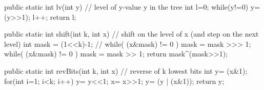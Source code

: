 

public static int lv(int y) 
// level of y-value y in the tree
{
int l=0;
while(y!=0)
    {
    y=(y>>1);
    l++;
    }
return l;
}




public static int shift(int k, int x)
// shift on the level of x (and step on the next level)
{
int mask = (1<<k)-1;
// while( (x&mask) != 0 ) mask = mask >>> 1;
while( (x&mask) != 0 ) mask = mask >> 1;
return mask^(mask>>1);
}



public static int revBits(int k, int x)
// reverse of k lowest bits
{
int y= (x&1);
for(int i=1; i<k; i++)
    {
    y= y<<1;
    x= x>>1;
    y= (y | (x&1));
    }
return y;
}




